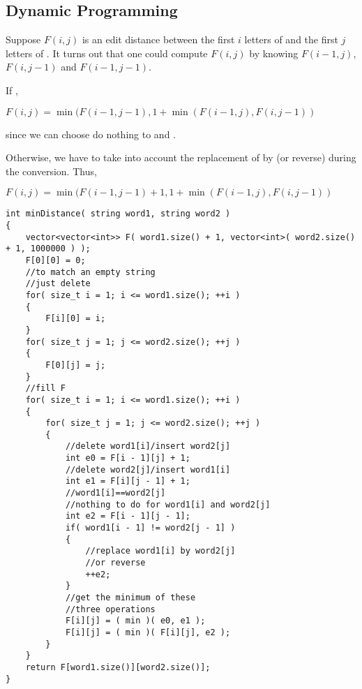 \subsection{Dynamic Programming}
Suppose $F(i, j)$ is an edit distance between the first $i$ letters of  and the first $j$ letters of . It turns out that one could compute $F(i,j)$ by knowing $F(i-1,j)$, $F(i,j-1)$ and $F(i-1,j-1)$.

If , 

$F(i,j) = \min(F(i-1,j-1), 1+\min(F(i-1,j), F(i,j-1))$ 

since we can choose do nothing to  and .

Otherwise, we have to take into account the replacement of  by  (or reverse) during the conversion. Thus, 

$F(i,j) = \min(F(i-1,j-1) + 1, 1+\min(F(i-1,j), F(i,j-1))$

\setcounter{lstlisting}{0}
\begin{lstlisting}[style=customc, caption={DP}]
int minDistance( string word1, string word2 )
{
    vector<vector<int>> F( word1.size() + 1, vector<int>( word2.size() + 1, 1000000 ) );
    F[0][0] = 0;
    //to match an empty string
    //just delete
    for( size_t i = 1; i <= word1.size(); ++i )
    {
        F[i][0] = i;
    }
    for( size_t j = 1; j <= word2.size(); ++j )
    {
        F[0][j] = j;
    }
    //fill F
    for( size_t i = 1; i <= word1.size(); ++i )
    {
        for( size_t j = 1; j <= word2.size(); ++j )
        {
            //delete word1[i]/insert word2[j]
            int e0 = F[i - 1][j] + 1;
            //delete word2[j]/insert word1[i]
            int e1 = F[i][j - 1] + 1;
            //word1[i]==word2[j]
            //nothing to do for word1[i] and word2[j]
            int e2 = F[i - 1][j - 1];
            if( word1[i - 1] != word2[j - 1] )
            {
                //replace word1[i] by word2[j]
                //or reverse
                ++e2;
            }
            //get the minimum of these
            //three operations
            F[i][j] = ( min )( e0, e1 );
            F[i][j] = ( min )( F[i][j], e2 );
        }
    }
    return F[word1.size()][word2.size()];
}
\end{lstlisting}